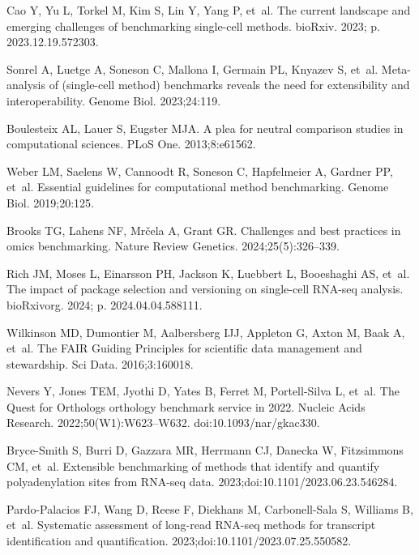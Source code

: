 \documentclass[11pt]{article}
\begin{document}
\begin{thebibliography}{10}

Cao Y, Yu L, Torkel M, Kim S, Lin Y, Yang P, et~al.
\newblock The current landscape and emerging challenges of benchmarking
  single-cell methods.
\newblock bioRxiv. 2023; p. 2023.12.19.572303.

Sonrel A, Luetge A, Soneson C, Mallona I, Germain PL, Knyazev S, et~al.
\newblock Meta-analysis of (single-cell method) benchmarks reveals the need for
  extensibility and interoperability.
\newblock Genome Biol. 2023;24:119.

Boulesteix AL, Lauer S, Eugster MJA.
\newblock A plea for neutral comparison studies in computational sciences.
\newblock PLoS One. 2013;8:e61562.

Weber LM, Saelens W, Cannoodt R, Soneson C, Hapfelmeier A, Gardner PP, et~al.
\newblock Essential guidelines for computational method benchmarking.
\newblock Genome Biol. 2019;20:125.

Brooks TG, Lahens NF, Mrčela A, Grant GR.
\newblock Challenges and best practices in omics benchmarking.
\newblock Nature Review Genetics. 2024;25(5):326--339.

Rich JM, Moses L, Einarsson PH, Jackson K, Luebbert L, Booeshaghi AS, et~al.
\newblock The impact of package selection and versioning on single-cell
  {RNA}-seq analysis.
\newblock bioRxivorg. 2024; p. 2024.04.04.588111.

Wilkinson MD, Dumontier M, Aalbersberg IJJ, Appleton G, Axton M, Baak A, et~al.
\newblock The {FAIR} Guiding Principles for scientific data management and
  stewardship.
\newblock Sci Data. 2016;3:160018.

Nevers Y, Jones TEM, Jyothi D, Yates B, Ferret M, Portell-Silva L, et~al.
\newblock The Quest for Orthologs orthology benchmark service in 2022.
\newblock Nucleic Acids Research. 2022;50(W1):W623–W632.
\newblock doi:{10.1093/nar/gkac330}.

Bryce-Smith S, Burri D, Gazzara MR, Herrmann CJ, Danecka W, Fitzsimmons CM,
  et~al.
\newblock Extensible benchmarking of methods that identify and quantify
  polyadenylation sites from RNA-seq data.
  2023;doi:{10.1101/2023.06.23.546284}.

Pardo-Palacios FJ, Wang D, Reese F, Diekhans M, Carbonell-Sala S, Williams B,
  et~al.
\newblock Systematic assessment of long-read RNA-seq methods for transcript
  identification and quantification. 2023;doi:{10.1101/2023.07.25.550582}.


\end{thebibliography}
\end{document}
